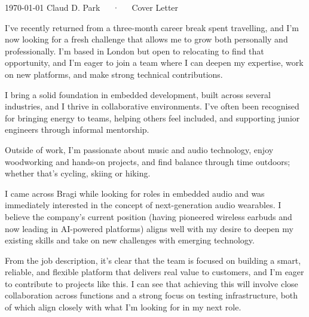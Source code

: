 \documentclass[11pt, a4paper]{awesome-cv}
\begin{document}
\makecvheader[R]

\makecvfooter
  {\today}
  {Claud D. Park~~~·~~~Cover Letter}
  {}

\makelettertitle

\begin{cvletter}

I’ve recently returned from a three-month career break spent travelling, and I’m now looking for a fresh challenge that allows me to grow both personally and professionally. I’m based in London but open to relocating to find that opportunity, and I’m eager to join a team where I can deepen my expertise, work on new platforms, and make strong technical contributions.

I bring a solid foundation in embedded development, built across several industries, and I thrive in collaborative environments. I’ve often been recognised for bringing energy to teams, helping others feel included, and supporting junior engineers through informal mentorship.

Outside of work, I’m passionate about music and audio technology, enjoy woodworking and hands-on projects, and find balance through time outdoors; whether that’s cycling, skiing or hiking.

I came across Bragi while looking for roles in embedded audio and was immediately interested in the concept of next-generation audio wearables. I believe the company’s current position (having pioneered wireless earbuds and now leading in AI-powered platforms) aligns well with my desire to deepen my existing skills and take on new challenges with emerging technology.

From the job description, it’s clear that the team is focused on building a smart, reliable, and flexible platform that delivers real value to customers, and I’m eager to contribute to projects like this. 
I can see that achieving this will involve close collaboration across functions and a strong focus on testing infrastructure, both of which align closely with what I’m looking for in my next role.


\end{cvletter}
\end{document}
